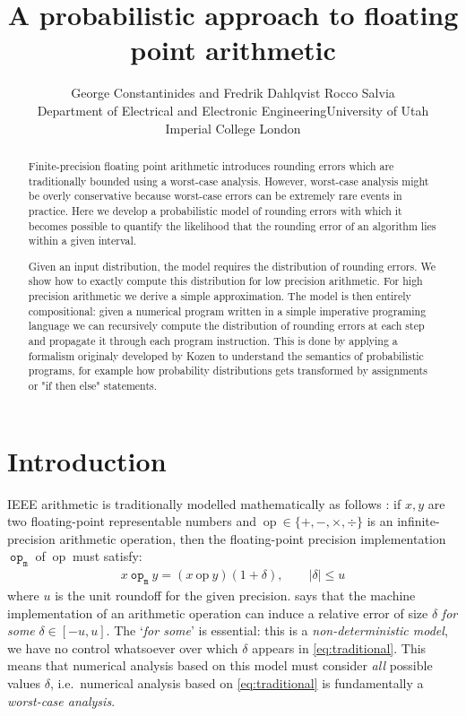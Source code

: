 \documentclass[10pt,conference]{IEEEtran}
\title{A probabilistic approach to floating point arithmetic}
\author{George Constantinides and Fredrik Dahlqvist \hspace{10em}Rocco Salvia \\ Department of Electrical and Electronic Engineering\hspace{7em}University of Utah\\ Imperial College London\hspace{13em} }
\newcommand{\ie}{i.e.\ }
\newcommand{\mop}{~\mathtt{op_m}~}
\newcommand{\iop}{~\mathrm{op}~}
\newcommand{\absv}[1]{\vert #1\vert}
\begin{document}
\maketitle

\begin{abstract}
Finite-precision floating point arithmetic introduces rounding errors which are traditionally bounded using a worst-case analysis. However, worst-case analysis might be overly conservative because worst-case errors can be extremely rare events in practice. Here we develop a probabilistic model of rounding errors with which it becomes possible to quantify the likelihood that the rounding error of an algorithm lies within a given interval. 

Given an input distribution, the model requires the distribution of rounding errors. We show how to exactly compute this distribution for low precision arithmetic. For high precision arithmetic we derive a simple approximation. The model is then entirely compositional: given a numerical program written in a simple imperative programing language we can recursively compute the distribution of rounding errors at each step and propagate it through each program instruction. This is done by applying a formalism originaly developed by Kozen to understand the semantics of probabilistic programs, for example how probability distributions gets transformed by assignments or "if then else" statements.
\end{abstract}

\section{Introduction}

IEEE arithmetic \cite{ieee754} is traditionally modelled mathematically as follows \cite{higham2002accuracy}: if $x,y$ are two floating-point representable numbers and $\iop\in\{+,-,\times,\div\}$ is an infinite-precision arithmetic operation, then the floating-point precision implementation $\mop$ of $\iop$ must satisfy:
\begin{align}
x\mop y=(x\iop y)(1+\delta), \qquad\absv{\delta}\leq u\label{eq:traditional}
\end{align}
where $u$ is the unit roundoff for the given precision.  says that the machine implementation of an arithmetic operation can induce a relative error of size $\delta$ \emph{for some} $\delta\in\left[-u,u\right]$. The `\emph{for some}' is essential: this is a \emph{non-deterministic model}, we have no control whatsoever over which $\delta$ appears in \cref{eq:traditional}. This means that numerical analysis based on this model must consider \emph{all} possible values $\delta$, \ie numerical analysis based on \cref{eq:traditional} is fundamentally a \emph{worst-case analysis}. 
\end{document}

